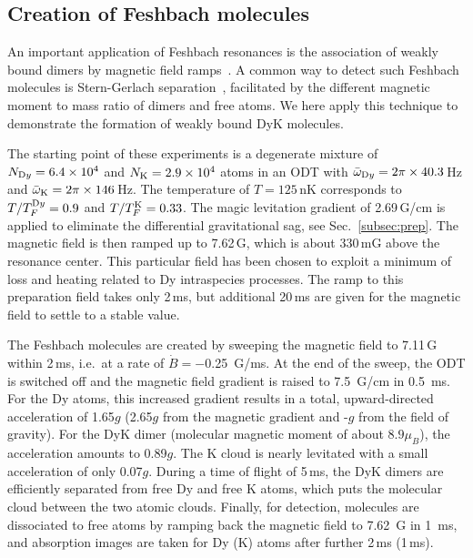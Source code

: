 \subsection{\label{sec:FRMole}Creation of Feshbach molecules}

An important application of Feshbach resonances is the association of weakly bound dimers by magnetic field ramps~\cite{Chin2010fri}. A common way to detect such Feshbach molecules is Stern-Gerlach separation~\cite{Regal2003cou,Herbig2003poa}, facilitated by the different magnetic moment to mass ratio of dimers and free atoms. We here apply this technique to demonstrate the formation of weakly bound DyK molecules.

The starting point of these experiments is a degenerate mixture of $N_{\textrm Dy} =6.4\times10^4$ and $N_{\textrm K}=2.9\times10^4$ atoms in an ODT with $\bar{\omega}_{\textrm Dy} =2\pi\times40.3$\,Hz and $\bar{\omega}_{\textrm K} =2\pi\times146$\,Hz. The temperature of $T =125$\,nK corresponds to $T/T_F^{\textrm Dy} =0.9$ and $T/T_F^{\textrm K} =0.33$. The magic levitation gradient of 2.69\,G/cm is applied to eliminate the differential gravitational sag, see Sec.~\ref{subsec:prep}. The magnetic field is then ramped up to 7.62\,G, which is about 330\,mG above the resonance center. This particular field has been chosen to exploit a minimum of loss and heating related to Dy intraspecies processes. The ramp to this preparation field takes only 2\,ms, but additional 20\,ms are given for the magnetic field to settle to a stable value. 

The Feshbach molecules are created by sweeping the magnetic field to 7.11\,G within 2\,ms, i.e.\ at a rate of $\dot{B}=$\SI{-0.25}{G/ms}. At the end of the sweep, the ODT is switched off and the magnetic field gradient is raised to \SI{7.5}{G/cm} in \SI{0.5}{ms}. For the Dy atoms, this increased gradient results in a total, upward-directed acceleration of 1.65$g$ (2.65$g$ from the magnetic gradient and -$g$ from the field of gravity). For the DyK dimer (molecular magnetic moment of about $8.9\mu_B$), the acceleration amounts to 0.89$g$. The K cloud is nearly levitated with a small acceleration of only 0.07$g$. During a time of flight of 5\,ms, the DyK dimers are efficiently separated from free Dy and free K atoms, which puts the molecular cloud between the two atomic clouds. Finally, for detection, molecules are dissociated to free atoms by ramping back the magnetic field to \SI{7.62}{G} in \SI{1}{ms}, and absorption images are taken for Dy (K) atoms after further 2\,ms (1\,ms).

